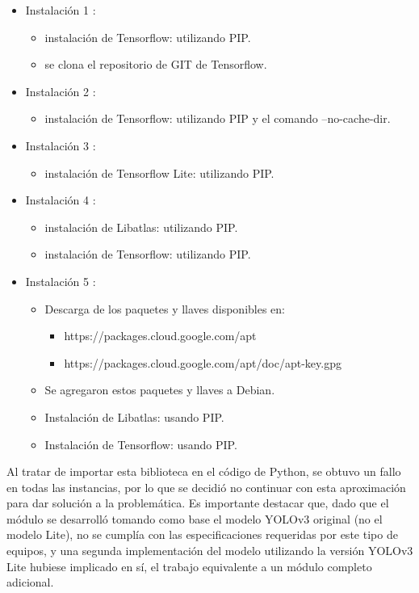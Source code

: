 \begin{itemize}
 \item Instalación 1 \cite{16}:
 	\begin{itemize}
 
 		\item instalación de Tensorflow: utilizando PIP.
 		\item se clona el repositorio de GIT de Tensorflow.
 	
 	\end{itemize}
 \item Instalación 2 \cite{17}:
 	\begin{itemize}
 		\item instalación de Tensorflow: utilizando PIP y el comando –no-cache-dir.
 	\end{itemize}
 \item Instalación 3 \cite{19}:
 	\begin{itemize}
 		\item instalación de Tensorflow Lite: utilizando PIP.
 	\end{itemize}
 \item Instalación 4 \cite{18}:
 	\begin{itemize}
		\item instalación de Libatlas: utilizando PIP.
 		\item instalación de Tensorflow: utilizando PIP.
 	\end{itemize}
 \item Instalación 5 \cite{20}:
 	\begin{itemize}
 		\item Descarga de los paquetes y llaves disponibles en:
 			\begin{itemize} 
 				\item https://packages.cloud.google.com/apt
 				\item https://packages.cloud.google.com/apt/doc/apt-key.gpg
 			\end{itemize}
 		\item Se agregaron estos paquetes y llaves a Debian.
 		\item Instalación de Libatlas: usando PIP.
 		\item Instalación de Tensorflow: usando PIP.
 	\end{itemize}
\end{itemize}


Al tratar de importar esta biblioteca en el código de Python, se obtuvo un fallo en todas las instancias, por lo que se decidió no continuar con esta aproximación para dar solución a la problemática. Es importante destacar que, dado que el módulo se desarrolló tomando como base el modelo YOLOv3 original (no el modelo Lite), no se cumplía con las especificaciones requeridas por este tipo de equipos, y una segunda implementación del modelo utilizando la versión YOLOv3 Lite hubiese implicado en sí, el trabajo equivalente a un módulo completo adicional.

